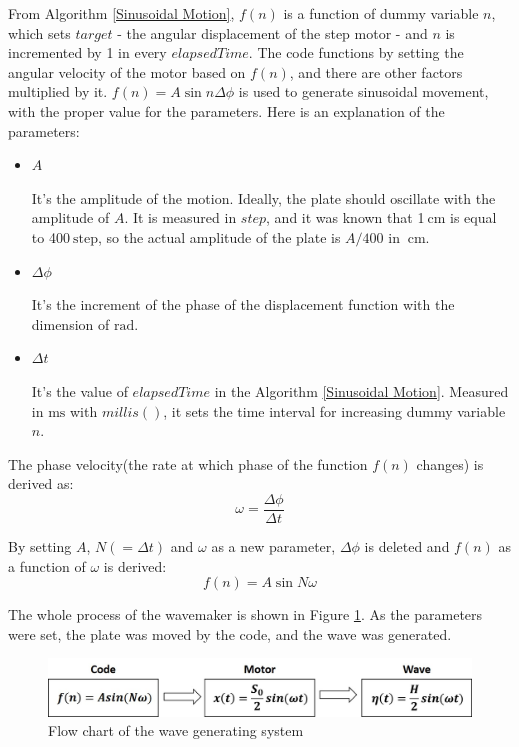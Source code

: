 From Algorithm \ref{Sinusoidal Motion}, $f(n)$ is a function of dummy variable $n$, which sets $target$ - the angular displacement of the step motor - and $n$ is incremented by 1 in every $elapsedTime$. The code functions by setting the angular velocity of the motor based on $f(n)$, and there are other factors multiplied by it. $f(n) = A\sin{n \Delta\phi}$ is used to generate sinusoidal movement, with the proper value for the parameters. Here is an explanation of the parameters:
\begin{itemize}
    \item $A$

    It's the amplitude of the motion. Ideally, the plate should oscillate with the amplitude of $A$. It is measured in $step$, and it was known that 1$\mathrm{~cm}$ is equal to 400$\mathrm{~step}$, so the actual amplitude of the plate is $A/400$ in $\mathrm{~cm}$.

    \item $\Delta\phi$

    It's the increment of the phase of the displacement function with the dimension of $\mathrm{rad}$.

    \item $\Delta t$

    It's the value of $elapsedTime$ in the Algorithm \ref{Sinusoidal Motion}. Measured in $\mathrm{ms}$ with $millis()$, it sets the time interval for increasing dummy variable $n$.
\end{itemize}

The phase velocity(the rate at which phase of the function $f(n)$ changes) is derived as:
\begin{equation}
    \omega = \frac{\Delta\phi}{\Delta t}
    \label{Code: Omega}
\end{equation}

By setting $A$, $N(=\Delta t)$ and $\omega$ as a new parameter, $\Delta \phi$ is deleted and $f(n)$ as a function of $\omega$ is derived:
\begin{equation}
    f(n) = A\sin{N\omega}
    \label{Code: New f(n) with parameter omega}
\end{equation}

The whole process of the wavemaker is shown in Figure \ref{Flow chart of the wave generating system}. As the parameters were set, the plate was moved by the code, and the wave was generated.

\begin{figure}[H]
    \centering
    \captionsetup{justification=centering}
    \includegraphics[width=12cm]{images/Flow_Chart(Analysis System).jpg}
    \caption{Flow chart of the wave generating system}
    \label{Flow chart of the wave generating system}
\end{figure}

